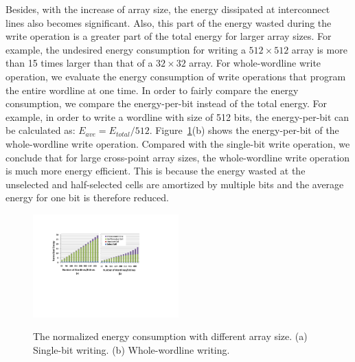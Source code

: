 Besides, with the increase of array size, the energy dissipated at
interconnect lines also becomes significant. Also, this part of the energy
wasted during the write operation is a greater part of the total energy
for larger array sizes. For example, the undesired energy consumption for
writing a $512{\times}512$ array is more than 15 times larger than that of
a $32{\times}32$ array. For whole-wordline write operation, we evaluate
the energy consumption of write operations that program the entire
wordline at one time. In order to fairly compare the energy consumption,
we compare the energy-per-bit instead of the total energy. For example, in
order to write a wordline with size of 512 bits, the energy-per-bit can be
calculated as: $E_{ave}=E_{total}/512$. Figure~\ref{fig:energy}(b) shows
the energy-per-bit of the whole-wordline write operation. Compared with
the single-bit write operation, we conclude that for large cross-point
array sizes, the whole-wordline write operation is much more energy
efficient. This is because the energy wasted at the unselected and
half-selected cells are amortized by multiple bits and the average energy
for one bit is therefore reduced.

\begin{figure}%
\centering
  \includegraphics[width=0.5\textwidth]{./figures/energy_f_tall2.pdf}\\ \vspace{-5pt}
  \caption{The normalized energy consumption with different array size. (a) Single-bit writing. (b) Whole-wordline writing.}\label{fig:energy}
    \vspace{-18pt}
\end{figure}

